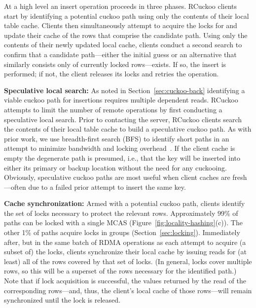 At a high level an insert operation proceeds in three phases.  RCuckoo
clients start by identifying a potential cuckoo path using only the
contents of their local table cache.  Clients then simultaneously
attempt to acquire the locks for and update their cache of the rows
that comprise the candidate path.  Using only the contents of their
newly updated local cache, clients conduct a second search to confirm
that a candidate path---either the initial guess or an alternative
that similarly consists only of currently locked rows---exists.  If
so, the insert is performed; if not, the client releases its locks and
retries the operation.

\textbf{Speculative local search:} As noted in
Section~\ref{sec:cuckoo-back} identifying a viable cuckoo path for
insertions requires multiple dependent reads.  RCuckoo attempts to
limit the number of remote operations by first conducting a
speculative local search. Prior to contacting the server, RCuckoo
clients search the contents of their local table cache to build a
speculative cuckoo path.  As with prior work, we use breadth-first
search (BFS) to identify short paths in an attempt to minimize
bandwidth and locking overhead~\cite{cuckoo-improvements}.  If the
client cache is empty the degenerate path is presumed, i.e., that the
key will be inserted into either its primary or backup location
without the need for any cuckooing.  Obviously, speculative cuckoo
paths are most useful when client caches are fresh---often due to a
failed prior attempt to insert the same key.


\textbf{Cache synchronization:} Armed with a potential
cuckoo path, clients identify the set of locks necessary to
protect the relevant rows.  
Approximately 99\% of paths can be locked with a single MCAS
(Figure~\ref{fig:locality-hashing}(c)). The other 1\% of
paths acquire locks in groups (Section~\ref{sec:locking}).
Immediately after, but in the same batch of RDMA operations
as each attempt to acquire (a subset of) the locks, clients
synchronize their local cache by issuing reads for (at
least) all of the rows covered by that set of locks.  (In
general, locks cover multiple rows, so this will be a
superset of the rows necessary for the identified path.)
Note that if lock acquisition is successful, the values
returned by the read of the corresponding rows---and, thus,
the client's local cache of those rows---will remain
synchronized until the lock is released.

